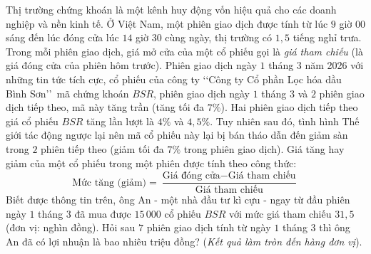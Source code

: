 \begin{ex}%
	Thị trường chứng khoán là một kênh huy động vốn hiệu quả cho các doanh nghiệp và nền kinh tế. Ở Việt Nam, một phiên giao dịch được tính từ lúc $9$ giờ $00$ sáng đến lúc đóng cửa lúc $14$ giờ $30$ cùng ngày, thị trường có $1{,}5$ tiếng nghỉ trưa. Trong mỗi phiên giao dịch, giá mở cửa của một cổ phiếu gọi là \textit{giá tham chiếu} (là giá đóng cửa của phiên hôm trước). Phiên giao dịch ngày $1$ tháng $3$ năm 2026 với những tin tức tích cực, cổ phiếu của công ty \lq\lq Công ty Cổ phần Lọc hóa dầu Bình Sơn\rq\rq\ mã chứng khoán $BSR$, phiên giao dịch ngày $1$ tháng $3$ và $2$ phiên giao dịch tiếp theo, mã này tăng trần (tăng tối đa $7\%$). Hai phiên giao dịch tiếp theo giá cổ phiếu $BSR$ tăng lần lượt là $4\%$ và $4{,}5\%$. Tuy nhiên sau đó, tình hình Thế giới tác động ngược lại nên mã cổ phiếu này lại bị bán tháo dẫn đến giảm sàn trong $2$ phiên tiếp theo (giảm tối đa $7\%$ trong phiên giao dịch). 
	Giá tăng hay giảm của một cổ phiếu trong một phiên được tính theo công thức:
	$$\text{Mức tăng (giảm)}=\dfrac{\text{Giá đóng cửa} -\text{Giá tham chiếu}}{\text{Giá tham chiếu}}$$
	Biết được thông tin trên, ông An - một nhà đầu tư kì cựu - ngay từ đầu phiên ngày $1$ tháng $3$ đã mua được $15\,000$ cổ phiếu $BSR$ với mức giá tham chiếu $31{,}5$ (đơn vị: nghìn đồng). Hỏi sau $7$ phiên giao dịch tính từ ngày $1$ tháng $3$ thì ông An đã có lợi nhuận là bao nhiêu triệu đồng? (\textit{Kết quả làm tròn đến hàng đơn vị}).
	\par{}
\end{ex}


